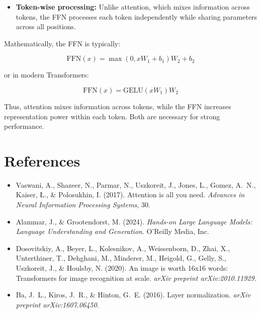 \documentclass[11pt]{article}
\begin{document}
\begin{enumerate}
\begin{itemize}[nosep]
\item \textbf{Token-wise processing:} Unlike attention, which mixes information across tokens, the FFN processes each token independently while sharing parameters across all positions.

\end{itemize}

Mathematically, the FFN is typically:

\[
\text{FFN}(x)
=
\max(0, xW_1 + b_1)W_2 + b_2
\]

or in modern Transformers:

\[
\text{FFN}(x)
=
\text{GELU}(xW_1)W_2
\]

Thus, attention mixes information across tokens, while the FFN increases representation power within each token. Both are necessary for strong performance.

\end{enumerate}

\section{References}

\begin{itemize}[nosep]
  \item Vaswani, A., Shazeer, N., Parmar, N., Uszkoreit, J., Jones, L., Gomez, A.~N., Kaiser, {\L}., \& Polosukhin, I. (2017). Attention is all you need. \emph{Advances in Neural Information Processing Systems}, 30.
  \item Alammar, J., \& Grootendorst, M. (2024). \emph{Hands-on Large Language Models: Language Understanding and Generation}. O'Reilly Media, Inc.
  \item Dosovitskiy, A., Beyer, L., Kolesnikov, A., Weissenborn, D., Zhai, X., Unterthiner, T., Dehghani, M., Minderer, M., Heigold, G., Gelly, S., Uszkoreit, J., \& Houlsby, N. (2020). An image is worth 16x16 words: Transformers for image recognition at scale. \emph{arXiv preprint arXiv:2010.11929}.
  \item Ba, J.~L., Kiros, J.~R., \& Hinton, G.~E. (2016). Layer normalization. \emph{arXiv preprint arXiv:1607.06450}.
\end{itemize}
\end{document}
